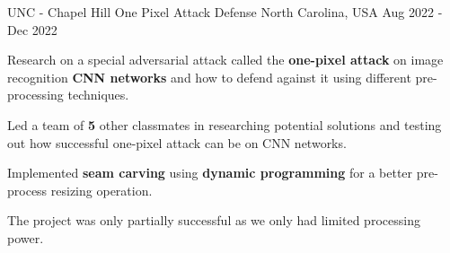 \begin{cventries}
  \cventry
    {UNC - Chapel Hill} %
    {One Pixel Attack Defense} %
    {North Carolina, USA} %
    {Aug 2022 - Dec 2022} %
    {
      \begin{cvitems} %
        \item {Research on a special adversarial attack called the \textbf{one-pixel attack} on image recognition \textbf{CNN networks} and how to defend against it using different pre-processing techniques.}
        \item {Led a team of \textbf{5} other classmates in researching potential solutions and testing out how successful one-pixel attack can be on CNN networks.}
        \item {Implemented \textbf{seam carving} using \textbf{dynamic programming} for a better pre-process resizing operation.}
        \item {The project was only partially successful as we only had limited processing power.}
      \end{cvitems}
    }

\end{cventries}
